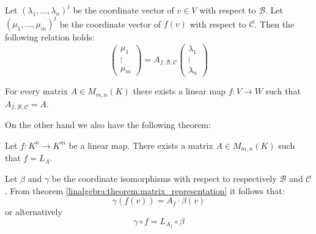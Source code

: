         \begin{theorem}
        	\label{linalgebra:theorem:matrix_representation}
			Let $(\lambda_1, ..., \lambda_n)^t$ be the coordinate vector of $v\in V$ with respect to $\mathcal{B}$. Let $(\mu_1, ..., \mu_m)^t$ be the coordinate vector of $f(v)$ with respect to $\mathcal{C}$. Then the following relation holds:
            \begin{equation}
				\left(\begin{array}{c}
					\mu_1\\\vdots\\\mu_m
				\end{array}\right)
                = A_{f, \mathcal{B}, \mathcal{C}}
                \left(\begin{array}{c}
					\lambda_1\\\vdots\\\lambda_n
				\end{array}\right)
			\end{equation}
		\end{theorem}
        \begin{theorem}
        	\label{linalgebra:theorem:map_matrix_link}
			For every matrix $A\in M_{m,n}(K)$ there exists a linear map $f:V\rightarrow W$ such that $A_{f, \mathcal{B}, \mathcal{C}} = A$.
		\end{theorem}
        On the other hand we also have the following theorem:
        \begin{theorem}
			Let $f:K^n\rightarrow K^m$ be a linear map. There exists a matrix $A\in M_{m,n}(K)$ such that $f=L_A$.
		\end{theorem}
        \begin{theorem}
			Let $\beta$ and $\gamma$ be the coordinate isomorphisms with respect to respectively $\mathcal{B}$ and $\mathcal{C}$. From theorem \ref{linalgebra:theorem:matrix_representation} it follows that:
            \begin{equation}
				\gamma(f(v)) = A_f\cdot\beta(v)
			\end{equation}
            or alternatively
            \begin{equation}
				\gamma\circ f = L_{A_f}\circ\beta
			\end{equation}
		\end{theorem}
        
